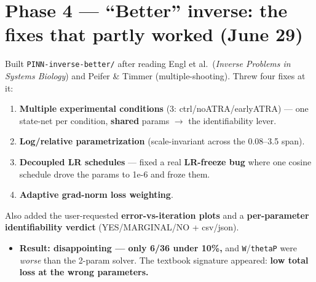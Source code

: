 \documentclass[11pt]{article}
\newcommand{\code}[1]{\texttt{\textcolor{codegray}{#1}}}
\begin{document}
\section*{Phase 4 --- ``Better'' inverse: the fixes that partly worked (June 29)}
Built \code{PINN-inverse-better/} after reading Engl et al.\ (\textit{Inverse Problems in Systems Biology}) and Peifer \& Timmer (multiple-shooting). Threw four fixes at it:
\begin{enumerate}
\item \textbf{Multiple experimental conditions} (3: ctrl/noATRA/earlyATRA) --- one state-net per condition, \textbf{shared} params $\rightarrow$ the identifiability lever.
\item \textbf{Log/relative parametrization} (scale-invariant across the 0.08--3.5 span).
\item \textbf{Decoupled LR schedules} --- fixed a real \textbf{LR-freeze bug} where one cosine schedule drove the params to 1e-6 and froze them.
\item \textbf{Adaptive grad-norm loss weighting}.
\end{enumerate}
Also added the user-requested \textbf{error-vs-iteration plots} and a \textbf{per-parameter identifiability verdict} (YES/MARGINAL/NO + csv/json).
\begin{itemize}
\item \textbf{Result: disappointing --- only 6/36 under 10\%,} and \code{W}/\code{thetaP} were \textit{worse} than the 2-param solver. The textbook signature appeared: \textbf{low total loss at the wrong parameters.}
\end{itemize}
\end{document}
